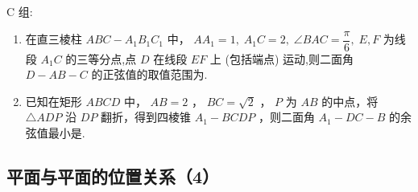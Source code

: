 \begin{enumerate}
\begin{jieda}
\begin{enumerate}
    \end{enumerate}
\end{jieda}

    
\end{enumerate}

C 组:
\begin{enumerate}

\item 在直三棱柱 $ {ABC} - {A}_{1}{B}_{1}{C}_{1} $ 中， $ {A{A}_{1}} = 1,\;{{A}_{1}C} = 2,\;{\angle {BAC}} = \dfrac{\pi }{6},\;E,F $ 为线段 $ {A}_{1}C $ 的三等分点,点 $ D $ 在线段 $ {EF} $ 上 (包括端点) 运动,则二面角 $ D - {AB} - C $ 的正弦值的取值范围为.

\item 已知在矩形 $ {ABCD} $ 中， $ {AB} = 2 $ ， $ {BC} = \sqrt{2} $ ， $ P $ 为 $ {AB} $ 的中点，将 $ \bigtriangleup  {ADP} $ 沿 $ {DP} $ 翻折，得到四棱锥 $ {A}_{1} - {BCDP} $ ，则二面角 $ {A}_{1} - {DC} - B $ 的余弦值最小是.



\end{enumerate}


\clearpage

\subsection*{平面与平面的位置关系（4）}


